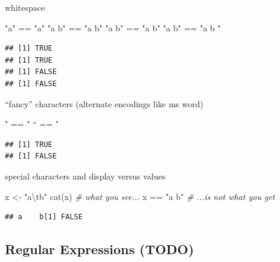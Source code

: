 \documentclass[
]{krantz}
\makeatletter
\newenvironment{Shaded}{\begin{snugshade}}{\end{snugshade}}
\newcommand{\CommentTok}[1]{\textcolor[rgb]{0.37,0.37,0.37}{\textit{#1}}}
\newcommand{\FunctionTok}[1]{\textcolor[rgb]{0,0,0}{#1}}
\newcommand{\NormalTok}[1]{#1}
\newcommand{\OtherTok}[1]{\textcolor[rgb]{0.37,0.37,0.37}{#1}}
\newcommand{\SpecialCharTok}[1]{\textcolor[rgb]{0,0,0}{#1}}
\newcommand{\StringTok}[1]{\textcolor[rgb]{0.5,0.5,0.5}{#1}}
\newenvironment{kframe}{%
\medskip{}
\setlength{\fboxsep}{.8em}
 \def\at@end@of@kframe{}%
 \ifinner\ifhmode%
  \def\at@end@of@kframe{\end{minipage}}%
  \begin{minipage}{\columnwidth}%
 \fi\fi%
 \def\FrameCommand##1{\hskip\@totalleftmargin \hskip-\fboxsep
 \colorbox{shadecolor}{##1}\hskip-\fboxsep
     \hskip-\linewidth \hskip-\@totalleftmargin \hskip\columnwidth}%
 \MakeFramed {\advance\hsize-\width
   \@totalleftmargin\z@ \linewidth\hsize
   \@setminipage}}%
 {\par\unskip\endMakeFramed%
 \at@end@of@kframe}
\renewenvironment{Shaded}{\begin{kframe}}{\end{kframe}}
\makeatother
\begin{document}
whitespace

\begin{Shaded}
\begin{Highlighting}[]
\StringTok{"a"} \SpecialCharTok{==} \StringTok{"a"}
\StringTok{"a b"} \SpecialCharTok{==} \StringTok{"a b"}
\StringTok{"a b"} \SpecialCharTok{==} \StringTok{"a  b"}
\StringTok{"a b"} \SpecialCharTok{==} \StringTok{"a b "}
\end{Highlighting}
\end{Shaded}

\begin{verbatim}
## [1] TRUE
## [1] TRUE
## [1] FALSE
## [1] FALSE
\end{verbatim}

``fancy'' characters (alternate encodings like ms word)

\begin{Shaded}
\begin{Highlighting}[]
\StringTok{\textquotesingle{} " \textquotesingle{}} \SpecialCharTok{==} \StringTok{\textquotesingle{} " \textquotesingle{}}
\StringTok{\textquotesingle{} “ \textquotesingle{}} \SpecialCharTok{==} \StringTok{\textquotesingle{} " \textquotesingle{}}
\end{Highlighting}
\end{Shaded}

\begin{verbatim}
## [1] TRUE
## [1] FALSE
\end{verbatim}

special characters and display versus values

\begin{Shaded}
\begin{Highlighting}[]
\NormalTok{x }\OtherTok{\textless{}{-}} \StringTok{"a}\SpecialCharTok{\textbackslash{}t}\StringTok{b"}
\FunctionTok{cat}\NormalTok{(x) }\CommentTok{\# what you see...}
\NormalTok{x }\SpecialCharTok{==} \StringTok{"a    b"} \CommentTok{\# ...is not what you get}
\end{Highlighting}
\end{Shaded}

\begin{verbatim}
## a    b[1] FALSE
\end{verbatim}

\hypertarget{regular-expressions-todo}{%
\subsection{Regular Expressions (TODO)}\label{regular-expressions-todo}}
\end{document}
